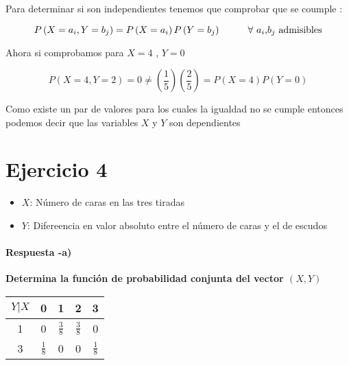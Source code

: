 \documentclass[12pt]{article}
\begin{document}
    \begin{flushleft}
        Para determinar si son independientes tenemos que comprobar que se coumple : 
    
    
    \begin{equation*}
        P \left(X = a_i , Y = b_j\right)  = P \left(X = a_i\right) P \left(Y= b_j\right)
        \hspace*{1cm } 
        \mbox{$\forall$ $a_i$,$b_j$ admisibles}
    \end{equation*}

   
        Ahora si comprobamos para $X = 4 $ , $Y = 0$ 
  

    \begin{equation*}
        P \left(X =4 , Y =2 \right) = 0 \neq \left(\frac{1}{5}\right) \left(\frac{2}{5}\right)  = P\left(X =4 \right)  P \left(Y = 0\right)
    \end{equation*}

   
        Como existe un par de valores para los cuales la igualdad no se cumple entonces 
        podemos decir que las variables $X$ y $Y$ son dependientes 
    \end{flushleft}



    \section*{Ejercicio 4 }

    \begin{itemize}
        \item $X$: N\'umero de caras en las tres tiradas
        \item $Y$: Difereencia en valor absoluto entre el n\'umero de caras y el de escudos 
    \end{itemize}

    \paragraph*{Respuesta -a) }{\bf Determina la funci\'on de probabilidad conjunta del vector $\left(X,Y\right)$}

    \begin{table}[h]
        \begin{center}
            \renewcommand{\arraystretch}{1.5}
            \begin{tabular}{|c|c|c|c|c|}
                \hline
                $Y|X$ & 0 & 1 & 2 & 3
                \\
                \hline
                1 & 0 &$  \frac{3}{8}$ & $\frac{3}{8} $ & 0
                \\
                \hline
                3 & $\frac{1}{8}$ & 0 & 0 &  $\frac{1}{8}$
                \\
                \hline
            \end{tabular}
        \end{center}
    \end{table}
\end{document}

